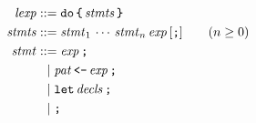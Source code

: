 \documentclass[12pt]{article}
\begin{document}
\pagestyle{empty}

\begin{align*}
  \mathit{lexp} &\mathrel{::=} \text{\texttt{do}} \,\text{\texttt{\{}} \,\mathit{stmts} \,\text{\texttt{\}}} \\
  \mathit{stmts} &\mathrel{::=} \mathit{stmt}_1 \,\cdots \,\mathit{stmt}_n \,\mathit{exp} \,[\text{\texttt{;}}] \hspace{20pt} (n \geq 0) \\
  \mathit{stmt}
  &\mathrel{::=} \mathit{exp} \,\text{\texttt{;}} \\
  &\phantom{::}\mid \mathit{pat} \,\text{\texttt{<-}} \,\mathit{exp} \,\text{\texttt{;}} \\
  &\phantom{::}\mid \text{\texttt{let}} \,\mathit{decls} \,\text{\texttt{;}} \\
  &\phantom{::}\mid \text{\texttt{;}}
\end{align*}
\end{document}
